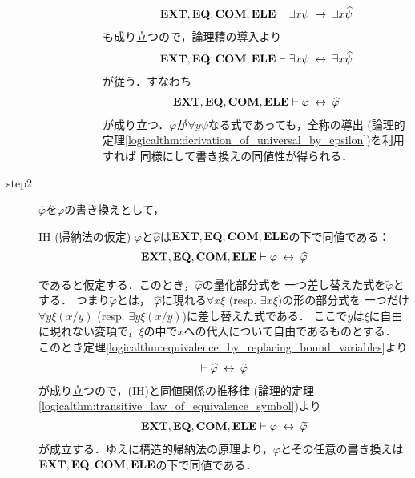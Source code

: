 \begin{sketch}
\begin{description}
\begin{description}
\begin{description}
								\begin{align}
									\mbox{{\bf EXT}},\mbox{{\bf EQ}},\mbox{\bf COM},\mbox{{\bf ELE}} \vdash \exists x \psi \hspace{0.25em}\rightarrow\hspace{0.25em} \exists x \widehat{\psi}
								\end{align}
								も成り立つので，論理積の導入より
								\begin{align}
									\mbox{{\bf EXT}},\mbox{{\bf EQ}},\mbox{\bf COM},\mbox{{\bf ELE}} \vdash \exists x \psi \hspace{0.25em}\leftrightarrow\hspace{0.25em} \exists x \widehat{\psi}
								\end{align}
								が従う．すなわち
								\begin{align}
									\mbox{{\bf EXT}},\mbox{{\bf EQ}},\mbox{\bf COM},\mbox{{\bf ELE}} \vdash \varphi \hspace{0.25em}\leftrightarrow\hspace{0.25em} \widehat{\varphi}
								\end{align}
								が成り立つ．$\varphi$が$\forall y \psi$なる式であっても，全称の導出
								(論理的定理\ref{logicalthm:derivation_of_universal_by_epsilon})を利用すれば
								同様にして書き換えの同値性が得られる．
						\end{description}
				\end{description}
				
			\item[step2] $\widehat{\varphi}$を$\varphi$の書き換えとして，
				\begin{itembox}[l]{IH (帰納法の仮定)}
					$\varphi$と$\widehat{\varphi}$は$\mbox{{\bf EXT}},\mbox{{\bf EQ}},\mbox{\bf COM},\mbox{{\bf ELE}}$の下で同値である：
					\begin{align}
						\mbox{{\bf EXT}},\mbox{{\bf EQ}},\mbox{\bf COM},\mbox{{\bf ELE}} \vdash \varphi \hspace{0.25em}\leftrightarrow\hspace{0.25em} \widehat{\varphi}
					\end{align}
				\end{itembox}
				であると仮定する．このとき，$\widehat{\varphi}$の量化部分式を
				一つ差し替えた式を$\widetilde{\varphi}$とする．
				つまり$\widetilde{\varphi}$とは，
				$\widehat{\varphi}$に現れる$\forall x \xi$ (resp. $\exists x \xi$)の形の部分式を
				一つだけ$\forall y \xi(x/y)$ (resp. $\exists y \xi(x/y)$)に差し替えた式である．
				ここで$y$は$\xi$に自由に現れない変項で，$\xi$の中で$x$への代入について自由であるものとする．
				このとき定理\ref{logicalthm:equivalence_by_replacing_bound_variables}より
				\begin{align}
					\vdash \widehat{\varphi} \hspace{0.25em}\leftrightarrow\hspace{0.25em} \widetilde{\varphi}
				\end{align}
				が成り立つので，(IH)と同値関係の推移律
				(論理的定理\ref{logicalthm:transitive_law_of_equivalence_symbol})より
				\begin{align}
					\mbox{{\bf EXT}},\mbox{{\bf EQ}},\mbox{\bf COM},\mbox{{\bf ELE}} \vdash \varphi \hspace{0.25em}\leftrightarrow\hspace{0.25em} \widetilde{\varphi}
				\end{align}
				が成立する．ゆえに構造的帰納法の原理より，$\varphi$とその任意の書き換えは
				$\mbox{{\bf EXT}},\mbox{{\bf EQ}},\mbox{\bf COM},\mbox{{\bf ELE}}$の下で同値である．
				\QED
		\end{description}
	\end{sketch}
	
